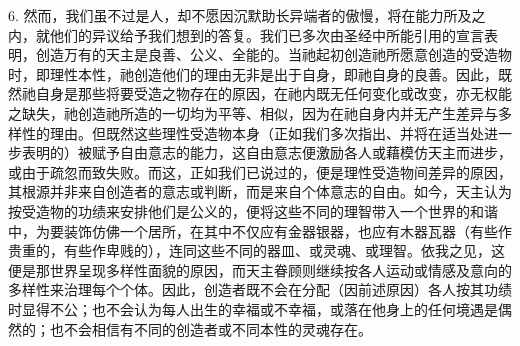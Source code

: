 6. 然而，我们虽不过是人，却不愿因沉默助长异端者的傲慢，将在能力所及之内，就他们的异议给予我们想到的答复。我们已多次由圣经中所能引用的宣言表明，创造万有的天主是良善、公义、全能的。当祂起初创造祂所愿意创造的受造物时，即理性本性，祂创造他们的理由无非是出于自身，即祂自身的良善。因此，既然祂自身是那些将要受造之物存在的原因，在祂内既无任何变化或改变，亦无权能之缺失，祂创造祂所造的一切均为平等、相似，因为在祂自身内并无产生差异与多样性的理由。但既然这些理性受造物本身（正如我们多次指出、并将在适当处进一步表明的）被赋予自由意志的能力，这自由意志便激励各人或藉模仿天主而进步，或由于疏忽而致失败。而这，正如我们已说过的，便是理性受造物间差异的原因，其根源并非来自创造者的意志或判断，而是来自个体意志的自由。如今，天主认为按受造物的功绩来安排他们是公义的，便将这些不同的理智带入一个世界的和谐中，为要装饰仿佛一个居所，在其中不仅应有金器银器，也应有木器瓦器（有些作贵重的，有些作卑贱的），连同这些不同的器皿、或灵魂、或理智。依我之见，这便是那世界呈现多样性面貌的原因，而天主眷顾则继续按各人运动或情感及意向的多样性来治理每个个体。因此，创造者既不会在分配（因前述原因）各人按其功绩时显得不公；也不会认为每人出生的幸福或不幸福，或落在他身上的任何境遇是偶然的；也不会相信有不同的创造者或不同本性的灵魂存在。\par

